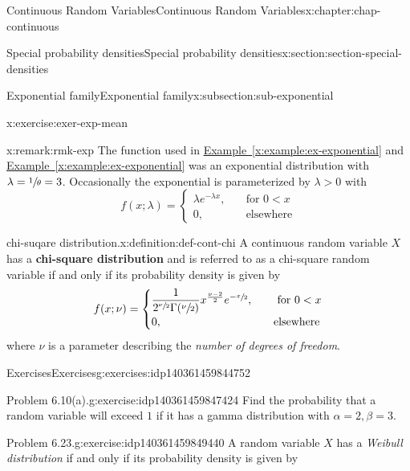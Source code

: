 \documentclass[oneside,10pt,]{book}
\newcommand{\xreffont}{\relax}
\newcommand{\terminology}[1]{\textbf{#1}}
\numberwithin{equation}{section}
\newcommand{\lt}{<}
\newcommand{\gt}{>}
\newcommand{\amp}{&}
\begin{document}
\begin{chapterptx}{Continuous Random Variables}{}{Continuous Random Variables}{}{}{x:chapter:chap-continuous}
\begin{sectionptx}{Special probability densities}{}{Special probability densities}{}{}{x:section:section-special-densities}
\begin{subsectionptx}{Exponential family}{}{Exponential family}{}{}{x:subsection:sub-exponential}
\begin{inlineexercise}{}{x:exercise:exer-exp-mean}
\end{inlineexercise}
\begin{remark}{}{x:remark:rmk-exp}%
The function used in \hyperref[x:example:ex-exponential]{Example~{\xreffont\ref{x:example:ex-exponential}}} and \hyperref[x:example:ex-exponential]{Example~{\xreffont\ref{x:example:ex-exponential}}} was an exponential distribution with \(\lambda = \sfrac{1}{\theta} = 3\).  Occasionally the exponential is parameterized by \(\lambda \gt 0\) with%
\begin{equation*}
f(x; \lambda) =
\begin{cases}\lambda e^{-\lambda x}, \amp \quad \text{
for } 0 \lt x\\0, \amp \quad \text{elsewhere}\end{cases}
\end{equation*}
%
\end{remark}
\begin{definition}{chi-suqare distribution.}{x:definition:def-cont-chi}%
A continuous random variable \(\displaystyle X\) has a \terminology{chi-square distribution} and is referred to as a chi-square random variable if and only if its probability density is given by%
\begin{equation*}
f(x; \nu) =
\begin{cases}\dfrac{1}{2^{\sfrac{\nu}{2}}
\Gamma(\sfrac{\nu}{2})}x^{\frac{\nu-2}{2}}e^{-\sfrac{x}{2}}, \amp \quad
\text{
for }0 \lt x\\0, \amp \quad \text{elsewhere}\end{cases}
\end{equation*}
where \(\nu\) is a parameter describing the \emph{number of degrees of freedom}.%
\end{definition}
%
%
\typeout{************************************************}
\typeout{************************************************}
%
\begin{exercises-subsubsection}{Exercises}{}{Exercises}{}{}{g:exercises:idp140361459844752}
\begin{divisionexercise}{1}{Problem 6.10(a).}{}{g:exercise:idp140361459847424}%
Find the probability that a random variable will exceed \(1\) if it has a gamma distribution with \(\alpha=2, \beta=3\).%
\end{divisionexercise}%
\begin{divisionexercise}{2}{Problem 6.23.}{}{g:exercise:idp140361459849440}%
A random variable \(X\) has a \emph{Weibull distribution} if and only if its probability density is given by%
\begin{equation*}

\end{equation*}
\end{divisionexercise}
\end{exercises-subsubsection}
\end{subsectionptx}
\end{sectionptx}
\end{chapterptx}
\end{document}
